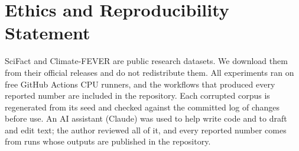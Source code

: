 \documentclass[11pt]{article}
\begin{document}
\section*{Ethics and Reproducibility Statement}
SciFact and Climate-FEVER are public research datasets. We download them from their official releases and do
not redistribute them. All experiments ran on free GitHub Actions CPU runners, and the workflows that produced
every reported number are included in the repository. Each corrupted corpus is regenerated from its seed and
checked against the committed log of changes before use. An AI assistant (Claude) was used to help write code
and to draft and edit text; the author reviewed all of it, and every reported number comes from runs whose
outputs are published in the repository.


\end{document}

